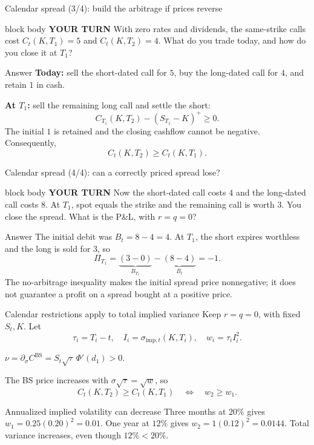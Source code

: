 \documentclass[handout,10pt,aspectratio=169]{beamer}
\newenvironment{pausebox}{\begin{beamercolorbox}[rounded=true,sep=0.8em,wd=\textwidth]{block body}
  \textbf{\color{CourseGold}YOUR TURN}\quad}{\end{beamercolorbox}}
\newcommand{\1}{\mathbf 1}
\newcommand{\Ncdf}{\Phi}
\newcommand{\greekrecall}[1]{\par{\small\color{CourseBlue}\(\displaystyle #1\)\par}}
\begin{document}
\begin{frame}{Calendar spread (3/4): build the arbitrage if prices reverse}
\begin{pausebox}
With zero rates and dividends, the same-strike calls cost
\(C_t(K,T_1)=5\) and \(C_t(K,T_2)=4\).
What do you trade today, and how do you close it at \(T_1\)?
\end{pausebox}

\begin{exampleblock}{Answer}
\textbf{Today:} sell the short-dated call for \(5\), buy the long-dated
call for \(4\), and retain \(1\) in cash.
\medskip

\textbf{At \(T_1\):} sell the remaining long call and settle the short:
\[
C_{T_1}(K,T_2)-(S_{T_1}-K)^+\ge0.
\]
The initial \(1\) is retained and the closing cashflow cannot be negative.
Consequently,
\[
\boxed{C_t(K,T_2)\ge C_t(K,T_1).}
\]
\end{exampleblock}
\end{frame}

\begin{frame}{Calendar spread (4/4): can a correctly priced spread lose?}
\begin{pausebox}
Now the short-dated call costs \(4\) and the long-dated call costs \(8\).
At \(T_1\), spot equals the strike and the remaining call is worth \(3\).
You close the spread. What is the P\&L, with \(r=q=0\)?
\end{pausebox}

\begin{exampleblock}{Answer}
The initial debit was \(B_t=8-4=4\). At \(T_1\), the short expires
worthless and the long is sold for \(3\), so
\[
\boxed{\Pi_{T_1}=\underbrace{(3-0)}_{B_{T_1}}-
\underbrace{(8-4)}_{B_t}=-1.}
\]
The no-arbitrage inequality makes the initial spread price nonnegative;
it does not guarantee a profit on a spread bought at a positive price.
\end{exampleblock}
\end{frame}

\begin{frame}{Calendar restrictions apply to total implied variance}
Keep \(r=q=0\), with fixed \(S_t,K\). Let
\[
\tau_i=T_i-t,\quad I_i=\sigma_{\mathrm{imp},t}(K,T_i),
\quad w_i=\tau_i I_i^2.
\]
\greekrecall{\nu=\partial_\sigma C^{\mathrm{BS}}
=S_t\sqrt{\tau}\,\Ncdf'(d_1)>0.}
The BS price increases with \(\sigma\sqrt{\tau}=\sqrt w\), so
\[
\boxed{C_t(K,T_2)\ge C_t(K,T_1)
\quad\Longleftrightarrow\quad w_2\ge w_1.}
\]
\begin{exampleblock}{Annualized implied volatility can decrease}
Three months at \(20\%\) gives \(w_1=0.25(0.20)^2=0.01\).
One year at \(12\%\) gives \(w_2=1(0.12)^2=0.0144\).
Total variance increases, even though \(12\%<20\%\).
\end{exampleblock}
\end{frame}
\end{document}
